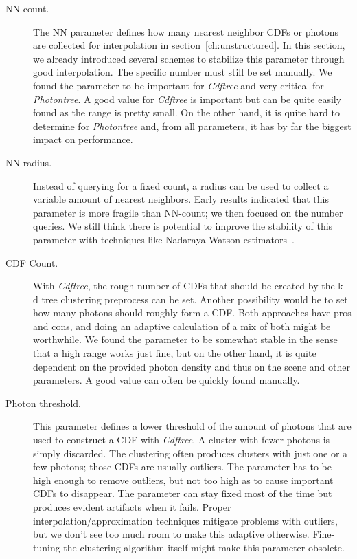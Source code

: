 \begin{description}
    \item[NN-count.] The NN parameter defines how many nearest neighbor CDFs or photons are collected for interpolation in section~\ref{ch:unstructured}. In this section, we already introduced several schemes to stabilize this parameter through good interpolation. The specific number must still be set manually. We found the parameter to be important for \textit{Cdftree} and very critical for \textit{Photontree}. A good value for \textit{Cdftree} is important but can be quite easily found as the range is pretty small. On the other hand, it is quite hard to determine for \textit{Photontree} and, from all parameters, it has by far the biggest impact on performance.
    \item[NN-radius.] Instead of querying for a fixed count, a radius can be used to collect a variable amount of nearest neighbors. Early results indicated that this parameter is more fragile than NN-count; we then focused on the number queries. We still think there is potential to improve the stability of this parameter with techniques like Nadaraya-Watson estimators~\parencite{nadaraya1964estimating}.
    \item[CDF Count.] With \textit{Cdftree}, the rough number of CDFs that should be created by the k-d tree clustering preprocess can be set. Another possibility would be to set how many photons should roughly form a CDF. Both approaches have pros and cons, and doing an adaptive calculation of a mix of both might be worthwhile. We found the parameter to be somewhat stable in the sense that a high range works just fine, but on the other hand, it is quite dependent on the provided photon density and thus on the scene and other parameters. A good value can often be quickly found manually.
    \item[Photon threshold.] This parameter defines a lower threshold of the amount of photons that are used to construct a CDF with \textit{Cdftree}. A cluster with fewer photons is simply discarded. The clustering often produces clusters with just one or a few photons; those CDFs are usually outliers. The parameter has to be high enough to remove outliers, but not too high as to cause important CDFs to disappear. The parameter can stay fixed most of the time but produces evident artifacts when it fails. Proper interpolation/approximation techniques mitigate problems with outliers, but we don't see too much room to make this adaptive otherwise. Fine-tuning the clustering algorithm itself might make this parameter obsolete.
    
\end{description}


